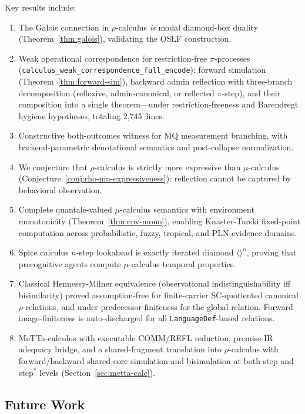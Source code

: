 \documentclass[11pt]{article}
\theoremstyle{definition}
\theoremstyle{remark}
\begin{document}
Key results include:
\begin{enumerate}[leftmargin=1.5em]
  \item The Galois connection in $\rho$-calculus \emph{is} modal
    diamond-box duality (Theorem~\ref{thm:galois}), validating the OSLF
    construction.
  \item Weak operational correspondence for restriction-free
    $\pi$-processes (\texttt{calculus\_weak\_correspondence\_full\_encode}):
    forward simulation (Theorem~\ref{thm:forward-sim}), backward admin
    reflection with three-branch decomposition (reflexive,
    admin-canonical, or reflected $\pi$-step), and their composition
    into a single theorem---under restriction-freeness and Barendregt
    hygiene hypotheses, totaling 2{,}745~lines.
  \item Constructive both-outcomes witness for MQ measurement branching,
    with backend-parametric denotational semantics and post-collapse
    normalization.
  \item We conjecture that $\rho$-calculus is strictly more expressive
    than $\mu$-calculus (Conjecture~\ref{conj:rho-mu-expressiveness}):
    reflection cannot be captured by behavioral observation.
  \item Complete quantale-valued $\mu$-calculus semantics with
    environment monotonicity (Theorem~\ref{thm:env-mono}), enabling
    Knaster-Tarski fixed-point computation across probabilistic, fuzzy,
    tropical, and PLN-evidence domains.
  \item Spice calculus $n$-step lookahead is exactly iterated diamond
    $\langle\rangle^n$, proving that precognitive agents compute
    $\mu$-calculus temporal properties.
  \item Classical Hennessy-Milner equivalence (observational
    indistinguishability iff bisimilarity) proved assumption-free for
    finite-carrier SC-quotiented canonical $\rho$-relations, and under
    predecessor-finiteness for the global relation.  Forward
    image-finiteness is auto-discharged for all
    \texttt{LanguageDef}-based relations.
  \item MeTTa-calculus with executable COMM/REFL reduction, premise-IR
    adequacy bridge, and a shared-fragment translation into
    $\rho$-calculus with forward/backward shared-core simulation and
    bisimulation at both step and step$^*$ levels
    (Section~\ref{sec:metta-calc}).
\end{enumerate}

\subsection{Future Work}
\end{document}
